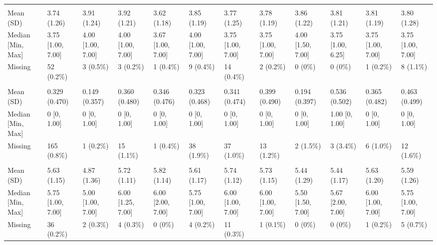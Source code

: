 \documentclass[
  single column]{article}
\begin{document}
\begin{landscape}
\begin{longtable}[t]{llllllllllll}
\addlinespace[0.3em]
\multicolumn{12}{l}{\textbf{Extraversion (Personality Trait)}}\\
\hspace{1em}Mean (SD) & 3.74 (1.26) & 3.91 (1.24) & 3.92 (1.21) & 3.62 (1.18) & 3.85 (1.19) & 3.77 (1.25) & 3.78 (1.19) & 3.86 (1.22) & 3.81 (1.21) & 3.81 (1.19) & 3.80 (1.28)\\
\hspace{1em}Median [Min, Max] & 3.75 [1.00, 7.00] & 4.00 [1.00, 7.00] & 4.00 [1.00, 7.00] & 3.67 [1.00, 7.00] & 4.00 [1.00, 7.00] & 3.75 [1.00, 7.00] & 3.75 [1.00, 7.00] & 4.00 [1.50, 7.00] & 3.75 [1.00, 6.25] & 3.75 [1.00, 7.00] & 3.75 [1.00, 7.00]\\
\hspace{1em}Missing & 52 (0.2\%) & 3 (0.5\%) & 3 (0.2\%) & 1 (0.4\%) & 9 (0.4\%) & 14 (0.4\%) & 2 (0.2\%) & 0 (0\%) & 0 (0\%) & 1 (0.2\%) & 8 (1.1\%)\\
\addlinespace[0.3em]
\multicolumn{12}{l}{\textbf{Health Disability Status (Yes/No)}}\\
\hspace{1em}Mean (SD) & 0.329 (0.470) & 0.149 (0.357) & 0.360 (0.480) & 0.346 (0.476) & 0.323 (0.468) & 0.341 (0.474) & 0.399 (0.490) & 0.194 (0.397) & 0.536 (0.502) & 0.365 (0.482) & 0.463 (0.499)\\
\hspace{1em}Median [Min, Max] & 0 [0, 1.00] & 0 [0, 1.00] & 0 [0, 1.00] & 0 [0, 1.00] & 0 [0, 1.00] & 0 [0, 1.00] & 0 [0, 1.00] & 0 [0, 1.00] & 1.00 [0, 1.00] & 0 [0, 1.00] & 0 [0, 1.00]\\
\hspace{1em}Missing & 165 (0.8\%) & 1 (0.2\%) & 15 (1.1\%) & 1 (0.4\%) & 38 (1.9\%) & 37 (1.0\%) & 13 (1.2\%) & 2 (1.5\%) & 3 (3.4\%) & 6 (1.0\%) & 12 (1.6\%)\\
\addlinespace[0.3em]
\multicolumn{12}{l}{\textbf{Honesty-Humility (Personality Trait)}}\\
\hspace{1em}Mean (SD) & 5.63 (1.15) & 4.87 (1.36) & 5.72 (1.11) & 5.82 (1.14) & 5.61 (1.17) & 5.74 (1.12) & 5.73 (1.15) & 5.44 (1.29) & 5.44 (1.17) & 5.63 (1.20) & 5.59 (1.26)\\
\hspace{1em}Median [Min, Max] & 5.75 [1.00, 7.00] & 5.00 [1.00, 7.00] & 6.00 [1.25, 7.00] & 6.00 [2.00, 7.00] & 5.75 [1.00, 7.00] & 6.00 [1.00, 7.00] & 6.00 [1.00, 7.00] & 5.50 [1.50, 7.00] & 5.67 [2.00, 7.00] & 6.00 [1.00, 7.00] & 5.75 [1.00, 7.00]\\
\hspace{1em}Missing & 36 (0.2\%) & 2 (0.3\%) & 4 (0.3\%) & 0 (0\%) & 4 (0.2\%) & 11 (0.3\%) & 1 (0.1\%) & 0 (0\%) & 0 (0\%) & 1 (0.2\%) & 5 (0.7\%)\\

\end{longtable}
\end{landscape}
\end{document}
